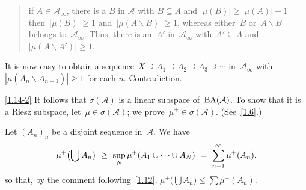 \documentclass[main.tex]{subfiles}
\begin{document}
\begin{quote}
if $A\in \mathcal{A}_\infty$,
there is a $B$ in $\mathcal A$ with $B\subseteq A$
and $|\mu(B)|\geq |\mu(A)|+1$
then~$|\mu(B)|\geq 1$
and~$|\mu(A\backslash B)|\ge 1$,
whereas either~$B$ or~$A\backslash B$
belongs to~$\mathcal{A}_\infty$.
Thus, there is an~$A'$ in~$\mathcal{A}_\infty$ with~$A'\subseteq A$
and~$|\mu(A\backslash A')|\ge 1$.
\end{quote}

It is now easy to obtain a 
sequence~$X\supseteq A_1\supseteq A_2\supseteq A_3 \supseteq \dotsb$
in~$\mathcal{A}_\infty$ 
with~$|\mu(A_n\backslash A_{n+1})|\geq 1$ for each $n$.
Contradiction.

\ref{1.14-2} 
It follows that $\sigma(\mathcal{A})$ 
is a linear subspace of~$\mathrm{BA}(\mathcal A)$.
To show that it is a Riesz subspace,
let~$\mu\in\sigma(\mathcal A)$;
we prove~$\mu^+\in\sigma(\mathcal A)$. (See~\ref{1.6}.)

Let $(A_n)_n$ be a disjoint sequence in~$\mathcal A$.
We have
\begin{equation*}
\mu^+ \bigl( \bigcup A_n \bigr)
   \ \geq\  \sup_N  \mu^+(A_1 \cup \dotsb \cup A_N) 
   \ =\  \sum_{n=1}^\infty \mu^+(A_n)
\textnormal{,}
\end{equation*}
so that, 
by the comment following~\ref{1.12},
$\mu^+\bigl(\bigcup A_n\bigr) \leq \sum\mu^+(A_n)$.
\end{document}
